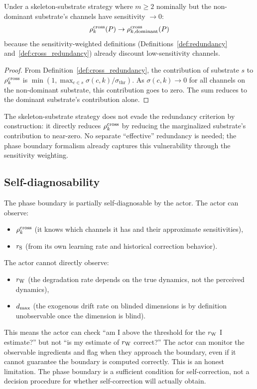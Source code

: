 \begin{corollary}
\label{cor:skeleton}
Under a skeleton-substrate strategy where $m \geq 2$ nominally but the
non-dominant substrate's channels have sensitivity $\to 0$:
\begin{equation}
\label{eq:skeleton}
\rho^{\mathrm{cross}}_k(P) \to \rho^{\mathrm{cross}}_{k,\mathrm{dominant}}(P)
\end{equation}
because the sensitivity-weighted definitions
(Definitions~\ref{def:redundancy} and~\ref{def:cross_redundancy})
already discount low-sensitivity channels.
\end{corollary}

\begin{proof}
From Definition~\ref{def:cross_redundancy}, the contribution of
substrate $s$ to $\rho^{\mathrm{cross}}_k$ is
$\min(1, \max_{c \in s} \sigma(c,k) / \sigma_{\mathrm{thr}})$.
As $\sigma(c,k) \to 0$ for all channels on the non-dominant substrate,
this contribution goes to zero.  The sum reduces to the dominant
substrate's contribution alone.
\end{proof}

The skeleton-substrate strategy does not evade the redundancy criterion
by construction: it directly reduces $\rho^{\mathrm{cross}}_k$ by reducing the
marginalized substrate's contribution to near-zero.  No separate
``effective'' redundancy is needed; the phase boundary formalism
already captures this vulnerability through the sensitivity weighting.

\subsection{Self-diagnosability}

The phase boundary is partially self-diagnosable by the actor.  The
actor can observe:
\begin{itemize}
\item $\rho^{\mathrm{cross}}_k$ (it knows which channels it has and their
  approximate sensitivities),
\item $r_{\mathrm{S}}$ (from its own learning rate and historical correction
  behavior).
\end{itemize}

The actor cannot directly observe:
\begin{itemize}
\item $r_{\mathrm{W}}$ (the degradation rate depends on the true dynamics, not the
  perceived dynamics),
\item $d_{\mathrm{max}}$ (the exogenous drift rate on blinded dimensions is by
  definition unobservable once the dimension is blind).
\end{itemize}

This means the actor can check ``am I above the threshold for the
$r_{\mathrm{W}}$ I estimate?'' but not ``is my estimate of $r_{\mathrm{W}}$ correct?''  The
actor can monitor the observable ingredients and flag when they
approach the boundary, even if it cannot guarantee the boundary is
computed correctly.  This is an honest limitation.  The phase boundary
is a sufficient condition for self-correction, not a decision
procedure for whether self-correction will actually obtain.

